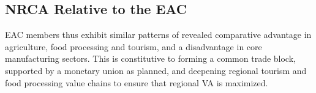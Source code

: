 \documentclass[a4paper]{article}
\begin{document}
%



\subsection{NRCA Relative to the EAC}

EAC members thus exhibit similar patterns of revealed comparative advantage in agriculture, food processing and tourism, and a disadvantage in core manufacturing sectors. This is constitutive to forming a common trade block, supported by a monetary union as planned, and deepening regional tourism and food processing value chains to ensure that regional VA is maximized. \newline
\end{document}
